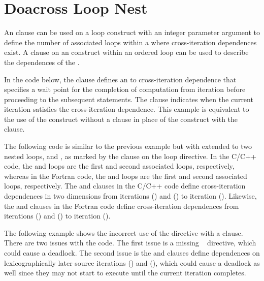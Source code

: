\pagebreak
\section{Doacross Loop Nest}
\label{sec:doacross}

An  clause can be used on a loop construct with an integer
parameter argument to define the number of associated loops within 
a  where cross-iteration dependences exist.
A  clause on an  construct within an ordered 
loop can be used to describe the dependences of the . 

In the code below, the  clause defines an  
to  cross-iteration dependence that specifies a wait point for 
the completion of computation from iteration  before proceeding 
to the subsequent statements. The  clause indicates 
when the current iteration satisfies the cross-iteration dependence.
This example is equivalent to the use of the  
construct without a clause in place of 
the  construct with the  clause.



The following code is similar to the previous example but with 
 extended to two nested loops,  and , 
as marked by the  clause on the loop directive. 
In the C/C++ code, the  and  loops are the first and
second associated loops, respectively, whereas
in the Fortran code, the  and  loops are the first and
second associated loops, respectively.
The  and  clauses in 
the C/C++ code define cross-iteration dependences in two dimensions from 
iterations () and () to iteration ().  
Likewise, the  and  clauses 
in the Fortran code define cross-iteration dependences from iterations 
() and () to iteration ().




The following example shows the incorrect use of the  
directive with a  clause.  There are two issues with the code.  
The first issue is a missing ~ directive,
which could cause a deadlock.  
The second issue is the  and  
clauses define dependences on lexicographically later 
source iterations () and (), which could cause 
a deadlock as well since they may not start to execute until the current iteration completes.

